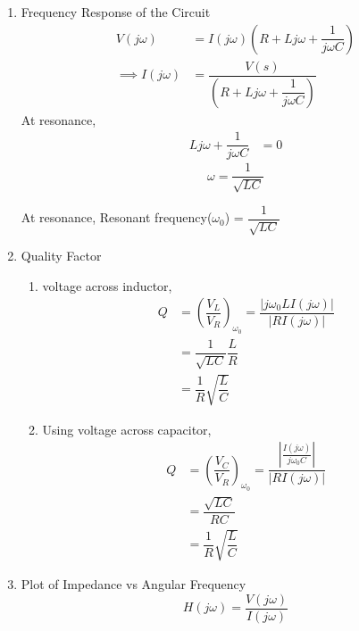 \documentclass[journal,12pt,twocolumn]{IEEEtran}
\theoremstyle{remark}
\providecommand{\abs}[1]{\left\vert#1\right\vert}
\begin{document}
\begin{enumerate}
\item {Frequency Response of the Circuit}
\begin{align}
   V(j\omega) &= I(j\omega)\left(R + Lj\omega + \dfrac{1}{j\omega C}\right)\\
    \implies I(j\omega) &= \dfrac{V(s)}{\left(R + Lj\omega + \dfrac{1}{j\omega C}\right)}\label{eq: 4}
\end{align}
At resonance,
\begin{align}
    Lj\omega + \dfrac{1}{j\omega C} &= 0
\end{align}
\begin{equation}
    \omega = \dfrac{1}{\sqrt{LC}}
\end{equation}

At resonance, Resonant frequency($\omega_0$) = $\dfrac{1}{\sqrt{LC}}$
\item{Quality Factor}

\begin{enumerate}
\item voltage across inductor,
\begin{align}
    Q &= \left(\dfrac{V_L}{V_R}\right)_{\omega_0} = \dfrac{\lvert{j\omega_0 LI(j\omega)}\rvert}{\lvert RI(j\omega) \rvert}\\
    &= \dfrac{1}{\sqrt{LC}}\dfrac{L}{R}\\
    &= \dfrac{1}{R}\sqrt{\dfrac{L}{C}}
\end{align}
\item Using voltage across capacitor,
\begin{align}
	Q &= \left(\dfrac{V_C}{V_R}\right)_{\omega_0} = \dfrac{\abs{\frac{I(j\omega)}{j\omega_0 C}}}{\lvert RI(j\omega) \rvert}\\
    &= \dfrac{\sqrt{LC}}{RC}\\
    &= \dfrac{1}{R}\sqrt{\dfrac{L}{C}}
\end{align}
\end{enumerate}
\item{Plot of Impedance vs Angular Frequency}
\begin{equation}
    H(j\omega) = \dfrac{V(j\omega)}{I(j\omega)}
\end{equation}


\end{enumerate}
\end{document}
